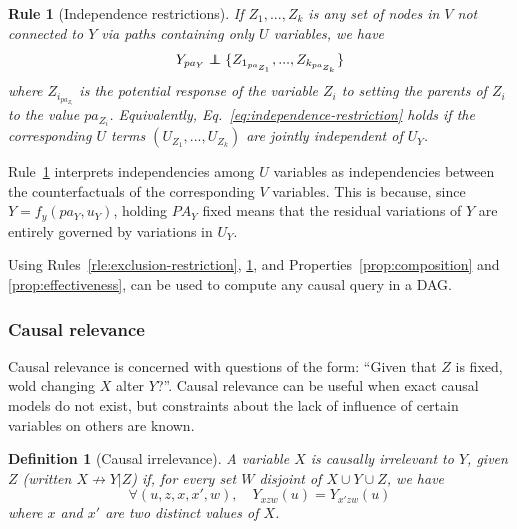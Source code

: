 \documentclass[11pt]{article}
\numberwithin{equation}{section}
\newcommand\indep{\protect\mathpalette{\protect\independenT}{\perp}}
\def\independenT#1#2{\mathrel{\rlap{$#1#2$}\mkern2mu{#1#2}}}
\newtheorem{defn}{Definition}[section]
\newtheorem{rle}{Rule}[section]
\begin{document}
\begin{rle}[Independence restrictions]\label{rle:independence-restriction}
If $Z_1, ..., Z_k$ is any set of nodes in $V$ not connected to $Y$ via paths containing only $U$ variables, we have
\begin{equation}
Y_{pa_Y} \indep \{Z_{1_{pa_{Z_1}}}, ..., Z_{k_{pa_{Z_k}}}\} \label{eq:independence-restriction}
\end{equation}
where $Z_{i_{pa_{Z_i}}}$ is the potential response of the variable $Z_i$ to setting the parents of $Z_i$ to the value $pa_{Z_i}$. Equivalently, Eq.~\ref{eq:independence-restriction} holds if the corresponding $U$ terms $(U_{Z_1}, ..., U_{Z_k})$ are jointly independent of $U_Y$.
\end{rle}
Rule~\ref{rle:independence-restriction} interprets independencies among $U$ variables as independencies between the counterfactuals of the corresponding $V$ variables. This is because, since $Y=f_y(pa_Y, u_Y)$, holding $PA_Y$ fixed means that the residual variations of $Y$ are entirely governed by variations in $U_Y$.

Using Rules~\ref{rle:exclusion-restriction}, \ref{rle:independence-restriction}, and Properties~\ref{prop:composition} and \ref{prop:effectiveness}, can be used to compute any causal query in a DAG.

\subsubsection{Causal relevance}
Causal relevance is concerned with questions of the form: ``Given that $Z$ is fixed, wold changing $X$ alter $Y$?''. Causal relevance can be useful when exact causal models do not exist, but constraints about the lack of influence of certain variables on others are known.

\begin{defn}[Causal irrelevance]
A variable $X$ is causally irrelevant to $Y$, given $Z$ (written $X \nrightarrow Y|Z$) if, for every set $W$ disjoint of $X \cup Y \cup Z$, we have
\begin{equation}
\forall (u, z, x, x', w), \quad Y_{xzw}(u) = Y_{x'zw}(u)
\end{equation}
where $x$ and $x'$ are two distinct values of $X$.
\end{defn}
\end{document}
